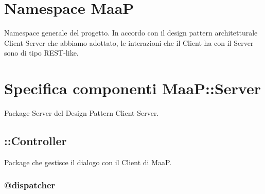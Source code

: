 \newpage


\section{Namespace MaaP}
Namespace generale del progetto. In accordo con il design pattern architetturale Client-Server che 
abbiamo adottato, le interazioni che il Client ha con il Server sono di tipo REST-like.

\section{Specifica componenti MaaP::Server}

Package Server del Design Pattern Client-Server. 

\subsection{::Controller}
Package che gestisce il dialogo con il Client di MaaP. 

\subsubsection{@dispatcher}

